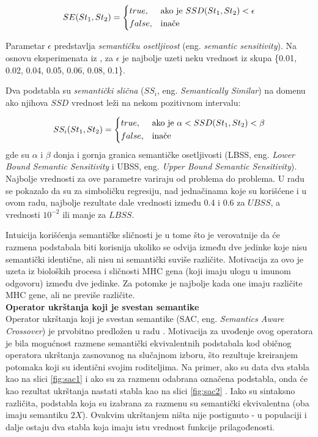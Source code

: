 \documentclass[main.tex]{subfiles}
\begin{document}
\[
    SE(St_1, St_2)= 
\begin{dcases}
    true,& \text{ako je } SSD(St_1, St_2) < \epsilon\\
    false,              & \text{inače}
\end{dcases}
\]
                        
Parametar $\epsilon$ predstavlja \textit{semantičku osetljivost} (eng. \textit{semantic sensitivity}). Na osnovu eksperimenata iz \cite{SACanalysis}, za $\epsilon$ je najbolje uzeti neku vrednost iz skupa \{0.01, 0.02, 0.04, 0.05, 0.06, 0.08, 0.1\}.

Dva podstabla su \textit{semantički slična} ($SS_i$, eng. \textit{Semantically Similar}) na domenu ako njihova $SSD$ vrednost leži na nekom pozitivnom intervalu:

\[
    SS_i(St_1, St_2)= 
\begin{dcases}
    true,& \text{ako je } \alpha < SSD(St_1, St_2) < \beta\\
    false,              & \text{inače}
\end{dcases}
\]
gde su $\alpha$ i $\beta$ donja i gornja granica semantičke osetljivosti (LBSS, eng. \textit{Lower Bound Semantic Sensitivity} i UBSS, eng. \textit{Upper Bound Semantic Sensitivity}). Najbolje vrednosti za ove parametre variraju od problema do problema. U radu \cite{semanticCrossover} se pokazalo da su za simboličku regresiju, nad jednačinama koje su korišćene i u ovom radu, najbolje rezultate dale vrednosti između 0.4 i 0.6 za $UBSS$, a vrednosti $10^{-2}$ ili manje za $LBSS$.

Intuicija korišćenja semantičke sličnosti je u tome što je verovatnije da će razmena podstabala biti korisnija ukoliko se odvija između dve jedinke koje nisu semantički identične, ali nisu ni semantički suviše različite. Motivacija za ovo je uzeta iz bioloških procesa i sličnosti MHC gena (koji imaju ulogu u imunom odgovoru) između dve jedinke. Za potomke je najbolje kada one imaju različite MHC gene, ali ne previše različite.\\


\textbf{Operator ukrštanja koji je svestan semantike}
\\

Operator ukrštanja koji je svestan semantike (SAC, eng. \textit{Semantics Aware Crossover}) je prvobitno predložen u radu \cite{SAC}. Motivacija za uvođenje ovog operatora je bila mogućnost razmene semantički ekvivalentnih podstabala kod običnog operatora ukrštanja zasnovanog na slučajnom izboru, što rezultuje kreiranjem potomaka koji su identični svojim roditeljima. Na primer, ako su data dva stabla kao na slici \ref{fig:sac1} i ako su za razmenu odabrana označena podstabla, onda će kao rezultat ukrštanja nastati stabla kao na slici \ref{fig:sac2} . Iako su sintaksno različita, podstabla koja su izabrana za razmenu su semantički ekvivalentna (oba imaju semantiku $2X$). Ovakvim ukrštanjem ništa nije postignuto - u populaciji i dalje ostaju dva stabla koja imaju istu vrednost funkcije prilagođenosti.
\end{document}
